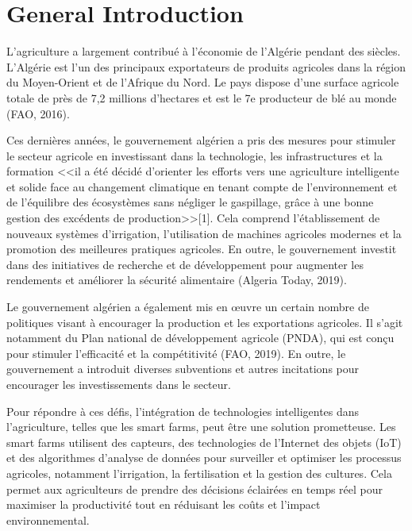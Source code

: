 \chapter*{General Introduction} 
\label{chap:introduction} 

L'agriculture a largement contribué à l'économie de l'Algérie pendant des siècles. L'Algérie est l'un des principaux exportateurs de produits agricoles dans la région du Moyen-Orient et de l'Afrique du Nord. Le pays dispose d'une surface agricole totale de près de 7,2 millions d'hectares et est le 7e producteur de blé au monde (FAO, 2016).

Ces dernières années, le gouvernement algérien a pris des mesures pour stimuler le secteur agricole en investissant dans la technologie, les infrastructures et la formation <<il a été décidé d’orienter les efforts vers une agriculture intelligente et solide face au changement climatique en tenant compte de l’environnement et de l’équilibre des écosystèmes sans négliger le gaspillage, grâce à une bonne gestion des excédents de production>>[1]. Cela comprend l'établissement de nouveaux systèmes d'irrigation, l'utilisation de machines agricoles modernes et la promotion des meilleures pratiques agricoles. En outre, le gouvernement investit dans des initiatives de recherche et de développement pour augmenter les rendements et améliorer la sécurité alimentaire (Algeria Today, 2019).

Le gouvernement algérien a également mis en œuvre un certain nombre de politiques visant à encourager la production et les exportations agricoles. Il s'agit notamment du Plan national de développement agricole (PNDA), qui est conçu pour stimuler l'efficacité et la compétitivité (FAO, 2019). En outre, le gouvernement a introduit diverses subventions et autres incitations pour encourager les investissements dans le secteur.


Pour répondre à ces défis, l'intégration de technologies intelligentes dans l'agriculture, telles que les smart farms, peut être une solution prometteuse. Les smart farms utilisent des capteurs, des technologies de l'Internet des objets (IoT) et des algorithmes d'analyse de données pour surveiller et optimiser les processus agricoles, notamment l'irrigation, la fertilisation et la gestion des cultures. Cela permet aux agriculteurs de prendre des décisions éclairées en temps réel pour maximiser la productivité tout en réduisant les coûts et l'impact environnemental.



